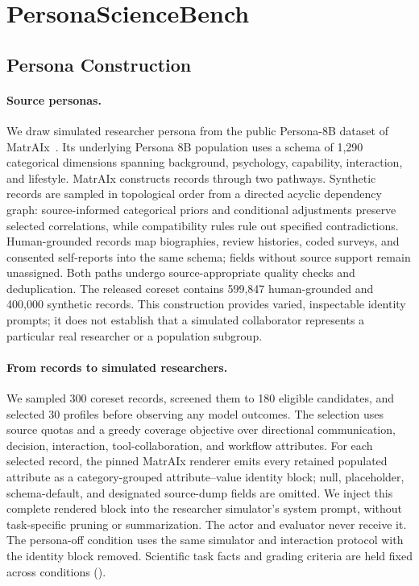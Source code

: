 \section{PersonaScienceBench}
\label{sec:benchmark}

\subsection{Persona Construction}
\label{sec:persona-construction}
\paragraph{Source personas.}
We draw simulated researcher persona from the public Persona-8B dataset of
MatrAIx~\cite{li2026matraix}. Its underlying Persona 8B population uses a schema of 1,290 categorical dimensions spanning background, psychology, capability, interaction, and lifestyle. MatrAIx constructs records through two pathways. Synthetic records are sampled in topological order from a directed acyclic dependency graph: source-informed categorical priors and conditional adjustments preserve selected correlations, while compatibility rules rule out specified contradictions. Human-grounded records map
biographies, review histories, coded surveys, and consented self-reports into the same schema; fields without source support remain unassigned. Both paths undergo source-appropriate quality checks and deduplication. The released coreset contains 599,847 human-grounded and 400,000 synthetic records. This construction provides varied, inspectable identity prompts; it does not establish that a simulated collaborator represents a particular real researcher or a population subgroup.

\paragraph{From records to simulated researchers.}
We sampled 300 coreset records, screened them to 180 eligible candidates, and
selected 30 profiles before observing any model outcomes. The selection uses
source quotas and a greedy coverage objective over directional communication,
decision, interaction, tool-collaboration, and workflow attributes. For each
selected record, the pinned MatrAIx renderer emits every retained populated
attribute as a category-grouped attribute--value identity block; null,
placeholder, schema-default, and designated source-dump fields are omitted.
We inject this complete rendered block into the researcher simulator's system
prompt, without task-specific pruning or summarization. The actor and
evaluator never receive it. The persona-off condition uses the same simulator
and interaction protocol with the identity block removed. Scientific task
facts and grading criteria are held fixed across conditions ().

